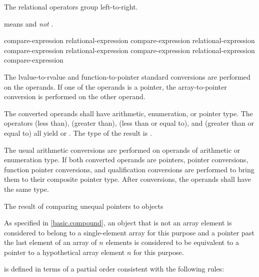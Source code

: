 \pnum
The relational operators group left-to-right.
\begin{example}
 means  and \emph{not}
.
\end{example}
%
%
%
%
%
%
%
%
%
\begin{bnf}
\br
    compare-expression\br
    relational-expression \terminal{<} compare-expression\br
    relational-expression \terminal{>} compare-expression\br
    relational-expression \terminal{<=} compare-expression\br
    relational-expression \terminal{>=} compare-expression
\end{bnf}
%
The
lvalue-to-rvalue
and function-to-pointer
standard conversions are performed on the operands.
If one of the operands is a pointer, the
array-to-pointer conversion is performed on the other operand.

\pnum
The converted operands shall have arithmetic, enumeration, or pointer type.
The
operators \tcode{<} (less than), \tcode{>} (greater than), \tcode{<=}
(less than or equal to), and \tcode{>=} (greater than or equal to) all
yield  or . The type of the result is
.

\pnum
The usual arithmetic conversions are performed on operands of arithmetic
or enumeration type. If both converted operands are pointers,
pointer conversions,
function pointer conversions, and
qualification conversions
are performed to bring
them to their composite pointer type.
After conversions, the operands shall have the same type.

\pnum
The result of comparing unequal pointers to objects
\begin{footnote}
As specified in \ref{basic.compound},
an object that is not an array element
is considered to belong to a
single-element array for this purpose and
a pointer past the last element of an array of $n$ elements
is considered to be equivalent to a pointer to a hypothetical array element
$n$ for this purpose.
\end{footnote}
is defined in terms of a partial order consistent with the following rules:

